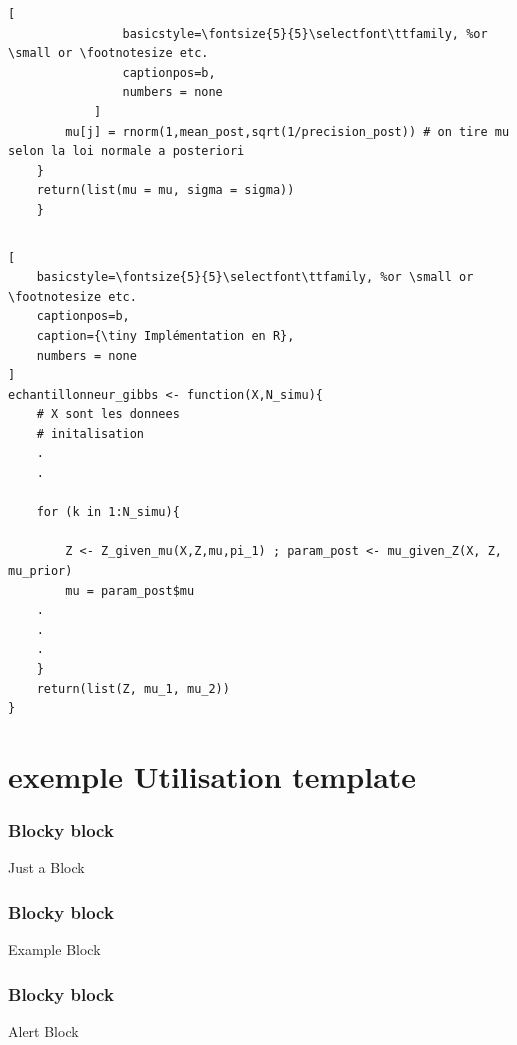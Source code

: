 \documentclass{presentation_template}
\begin{document}
\begin{frame}[fragile]
\begin{columns}
\begin{column}{0.5\textwidth}
\begin{lstlisting}[
                basicstyle=\fontsize{5}{5}\selectfont\ttfamily, %or \small or \footnotesize etc.
                captionpos=b,
                numbers = none
            ]
        mu[j] = rnorm(1,mean_post,sqrt(1/precision_post)) # on tire mu selon la loi normale a posteriori
    }
    return(list(mu = mu, sigma = sigma))
    }
        \end{lstlisting}
    \end{column}
\end{columns}
\vspace{-0.3cm}
\begin{lstlisting}[
    basicstyle=\fontsize{5}{5}\selectfont\ttfamily, %or \small or \footnotesize etc.
    captionpos=b,
    caption={\tiny Implémentation en R},
    numbers = none
]
echantillonneur_gibbs <- function(X,N_simu){
    # X sont les donnees
    # initalisation
    .
    .
    
    for (k in 1:N_simu){ 
        
        Z <- Z_given_mu(X,Z,mu,pi_1) ; param_post <- mu_given_Z(X, Z, mu_prior)
        mu = param_post$mu
    .
    .
    .
    }
    return(list(Z, mu_1, mu_2))
}     
\end{lstlisting}
\end{frame}


\section{exemple Utilisation template}

\begin{frame}
\frametitle{Blocky block}
\begin{block}{Just a Block}
\lipsum[1]
\end{block}
\end{frame}

\begin{frame}
\frametitle{Blocky block}
\begin{exampleblock}{Example Block}
\lipsum[1]
\end{exampleblock}
\end{frame}

\begin{frame}
\frametitle{Blocky block}
\begin{alertblock}{Alert Block}
\lipsum[1]
\end{alertblock}
\end{frame}
\end{document}
